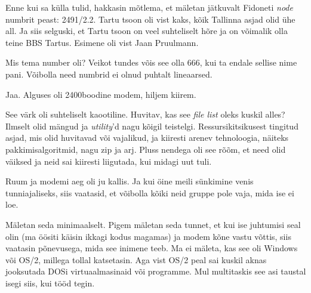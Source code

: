 Enne kui sa külla tulid, hakkasin mõtlema, et mäletan jätkuvalt Fidoneti 
\emph{node} numbrit peast: 2491/2.2. Tartu tsoon oli vist 
kaks, kõik Tallinna asjad olid ühe all. Ja siis selguski, et Tartu tsoon on veel 
suhteliselt hõre ja on võimalik olla teine BBS Tartus. Esimene oli vist Jaan 
Pruulmann.


Mis tema number oli? Veikot tundes võis see olla 666, kui ta endale
sellise nime pani. Võibolla need numbrid ei olnud puhtalt lineaarsed. 


Jaa. Alguses oli 2400boodine modem, hiljem kiirem.


See värk oli suhteliselt kaootiline. Huvitav, kas see \emph{file 
list} oleks kuskil alles? Ilmselt olid mängud ja
\emph{utility}'d nagu kõigil teistelgi. Ressursikitsikusest tingitud
asjad, mis olid huvitavad või vajalikud, ja kiiresti arenev tehnoloogia, näiteks 
pakkimisalgoritmid, nagu zip ja arj. Pluss nendega 
oli see rõõm, et need olid väiksed ja neid sai kiiresti liigutada, kui midagi uut 
tuli.


Ruum ja modemi aeg oli ju kallis. Ja kui 
öine meili sünkimine venis tunniajaliseks, siis vaatasid, et 
võibolla kõiki neid gruppe pole vaja, mida ise ei loe. 


Mäletan seda minimaalselt. 
Pigem mäletan seda tunnet, et kui ise juhtumisi seal olin (ma öösiti 
käisin ikkagi kodus magamas) ja modem kõne vastu võttis, siis vaatasin
põnevusega, mida see inimene teeb. Ma ei mäleta, kas see oli 
Windows või OS/2, millega tollal katsetasin. Aga 
vist OS/2 peal sai kuskil aknas jooksutada DOSi virtuaalmasinaid või programme. Mul multitaskis see asi taustal isegi siis, kui tööd tegin.

